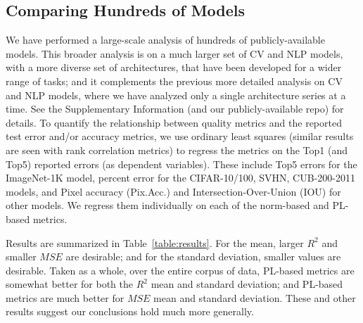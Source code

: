 \subsection{Comparing Hundreds of Models}
\label{sxn:all_cv_models}


We have performed a large-scale analysis of hundreds of publicly-available models.
This broader analysis is on a much larger set of CV and NLP models, with a more diverse set of architectures, that have been developed for a wider range of tasks; and it complements the previous more detailed analysis on CV and NLP models, where we have analyzed only a single architecture series at a time.
See the Supplementary Information
(and our publicly-available repo)
for details.
To quantify the relationship between quality metrics and the reported test error and/or accuracy metrics, we use ordinary least squares (similar results are seen with rank correlation metrics) to regress the metrics on the Top1 (and Top5) reported errors (as dependent variables).
These include Top5 errors for the ImageNet-1K model, percent error for the CIFAR-10/100, SVHN, CUB-200-2011 models, and Pixel accuracy (Pix.Acc.) and Intersection-Over-Union (IOU) for other models.
We regress them individually on each of the norm-based and PL-based metrics.



Results are summarized in Table~\ref{table:results}.
For the mean, larger $R^{2}$ and smaller $MSE$ are desirable; and for the standard deviation, smaller values are desirable.
Taken as a whole, over the entire corpus of data, PL-based metrics are somewhat better for both the $R^{2}$ mean and standard deviation;
and PL-based metrics are much better for $MSE$ mean and standard deviation.
These and other results suggest our conclusions hold much more generally.

